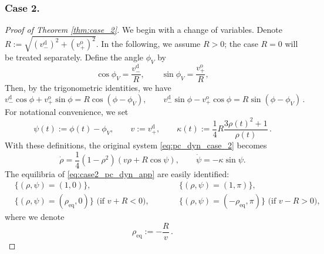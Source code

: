 \documentclass[10pt]{article}
\theoremstyle{definition}
\theoremstyle{definition}
\numberwithin{equation}{section}
\newcommand{\vDPlus}{v_+^{\text{d}}}
\newcommand{\vDMinus}{v_-^{\text{d}}}
\newcommand{\vOPlus}{v_+^{\text{o}}}
\newcommand{\Drho}{\Dot{\rho}}
\newcommand{\Dpsi}{\Dot{\psi}}
\newcommand{\deltaV}{\delta_{\mathrm{V}}}
\newcommand{\phiV}{\phi_{V}}
\newcommand{\rhoEq}{\rho_{\mathrm{eq}}}
\begin{document}
\subsubsection*{Case 2.}
\label{proof:case_2}
\begin{proof}[Proof of Theorem \ref{thm:case_2}]
We begin with a change of variables.
Denote $R := \sqrt{(\vDMinus)^2 + (\vOPlus)^2}$.
In the following, we assume $R > 0$; the case $R = 0$ will be treated separately.
Define the angle $\phiV$ by
\begin{equation}\label{eq:case2_phiV}
    \cos \phiV = \frac{\vDMinus}{R},
    \qquad
    \sin \phiV = \frac{\vOPlus}{R},
\end{equation}
Then, by the trigonometric identities, we have
\begin{equation*}
    \vDMinus \cos \phi + \vOPlus \sin \phi
    = R \cos (\phi - \phiV), \qquad \vDMinus \sin \phi - \vOPlus \cos \phi
    = R \sin (\phi - \phiV) \, . 
\end{equation*}
For notational convenience, we set
\begin{equation}\label{eq:case2_notation}
    \psi(t) := \phi (t) - \phiV, \qquad v := \vDPlus, \qquad \kappa(t) := \frac{1}{4}R \frac{3\rho(t)^2 + 1}{\rho(t)} \, .
\end{equation}
With these definitions, the original system \eqref{eq:pc_dyn_case_2} becomes
\begin{equation}\label{eq:case2_pc_dyn_app}
    \Drho = \frac{1}{4} (1 - \rho^2) (v \rho + R \cos \psi), \qquad  \Dpsi = -\kappa \sin \psi.
\end{equation}
The equilibria of \eqref{eq:case2_pc_dyn_app} are easily identified:
\begin{equation*}
\begin{aligned}
&\{ (\rho, \psi) = (1,0) \}, \qquad &&\{ (\rho, \psi) = (1,\pi) \},\\[5pt]
&\{ (\rho, \psi) = (\rhoEq,0) \} \text{ (if $v + R < 0$)}, \qquad &&\{ (\rho, \psi) = (-\rhoEq, \pi) \} \text{ (if $v - R > 0$)},
\end{aligned}
\end{equation*}
where we denote
\begin{equation}\label{eq:case2_rho_equi}
\rhoEq := - \frac{R}{v} \, .
\end{equation}


\end{proof}
\end{document}
